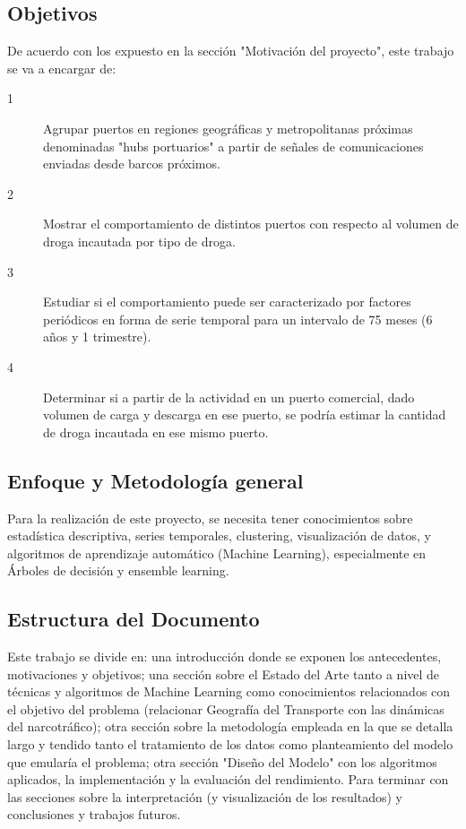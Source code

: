 \documentclass[12pt]{article}
\begin{document}
	\subsection{Objetivos}
	De acuerdo con los expuesto en la sección "Motivación del proyecto", este trabajo se va a encargar de:
	
	\begin{description}
		\item[1] Agrupar puertos en regiones geográficas y metropolitanas próximas denominadas "hubs portuarios" a partir de señales de comunicaciones enviadas desde barcos próximos.
		\item[2] Mostrar el comportamiento de distintos puertos con respecto al volumen de droga incautada por tipo de droga.
		\item[3] Estudiar si el comportamiento puede ser caracterizado por factores periódicos en forma de serie temporal para un intervalo de 75 meses (6 años y 1 trimestre).
		\item[4] Determinar si a partir de la actividad en un puerto comercial, dado volumen de carga y descarga en ese puerto, se podría estimar la cantidad de droga incautada en ese mismo puerto.
	\end{description}


	\subsection{Enfoque y Metodología general}
	Para la realización de este proyecto, se necesita tener conocimientos sobre estadística descriptiva, series temporales, clustering, visualización de datos, y algoritmos de aprendizaje automático (Machine Learning), especialmente en Árboles de decisión y ensemble learning.

	\subsection{Estructura del Documento}
	Este trabajo se divide en: una introducción donde se exponen los antecedentes, motivaciones y objetivos; una sección sobre el Estado del Arte tanto a nivel de técnicas y algoritmos de Machine Learning como conocimientos relacionados con el objetivo del problema (relacionar Geografía del Transporte con las dinámicas del narcotráfico); otra sección sobre la metodología empleada en la que se detalla largo y tendido tanto el tratamiento de los datos como planteamiento del modelo que emularía el problema; otra sección "Diseño del Modelo" con los algoritmos aplicados, la implementación y la evaluación del rendimiento. Para terminar con las secciones sobre la interpretación (y visualización de los resultados) y conclusiones y trabajos futuros.
\end{document}
